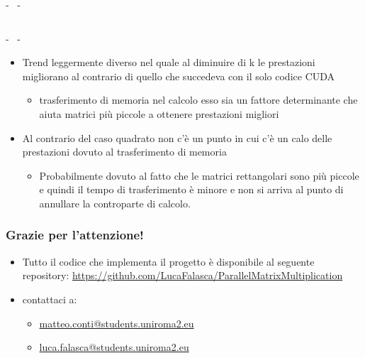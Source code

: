 \documentclass[compress]{beamer}
\begin{document}
\begin{frame}{\secname \text{ }- \subsecname\ \text{ }- \subsubsecname}
\begin{columns}
\begin{minipage}{0.75\textwidth}
\begin{adjustbox}{margin=1cm 0cm 0cm 0cm, center}
                \end{adjustbox}
            \end{minipage}
    \end{columns}
\end{frame}

\begin{frame}{\secname \text{ }- \subsecname\ \text{ }- \subsubsecname}
    \begin{itemize}
        \item Trend leggermente diverso nel quale al diminuire di k le prestazioni migliorano al contrario di quello che succedeva con il solo codice CUDA
        \begin{itemize}
            \item trasferimento di memoria nel calcolo esso sia un fattore determinante che aiuta matrici più piccole a ottenere prestazioni migliori
        \end{itemize}
        \item Al contrario del caso quadrato non c'è un punto in cui c'è un calo delle prestazioni dovuto al trasferimento di memoria
        \begin{itemize}
            \item Probabilmente dovuto al fatto che le matrici rettangolari sono più piccole e quindi il tempo di trasferimento è minore e non si arriva al punto di annullare la controparte di calcolo.
        \end{itemize} 
    \end{itemize}
\end{frame}




\begin{frame}
    \frametitle{Grazie per l'attenzione!}
    \begin{itemize}
        \item Tutto il codice che implementa il progetto è disponibile al
        seguente repository: \href{https://github.com/LucaFalasca/ParallelMatrixMultiplication}{https://github.com/LucaFalasca/ParallelMatrixMultiplication}
        \item contattaci a:
            \begin{itemize}
                \item \href{mailto:matteo.conti@students.uniroma2.eu}{matteo.conti@students.uniroma2.eu}
                \item \href{mailto:luca.falasca@students.uniroma2.eu}{luca.falasca@students.uniroma2.eu}
            \end{itemize}
       \end{itemize}
\end{frame}
\end{document}
